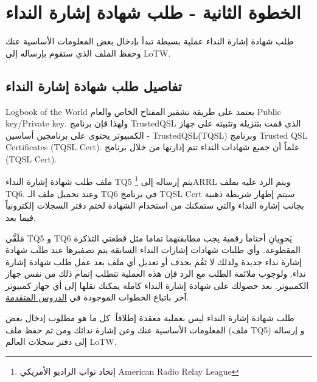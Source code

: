 \documentclass[a4paper,12pt]{article}
\begin{document}
\section{الخطوة الثانية - طلب شهادة إشارة النداء}\label{sec:2}

طلب شهادة إشارة النداء عملية بسيطة تبدأ بإدخال بعض المعلومات الأساسية
عنك وحفظ الملف الذي ستقوم بإرساله إلى \textenglish{LoTW}.

\vspace{18pt}
\begin{center}
	\color{slategray2}
{\Huge \decoone}
\end{center}

\subsection{تفاصيل طلب شهادة إشارة النداء}

\textenglish{Logbook of the World} يعتمد على طريقة تشفير المفتاح الخاص والعام \textenglish{Public
key/Private key}. ولهذا فإن برنامج \textenglish{TrustedQSL} الذي قمت بتنزيله وتثبيته
على جهاز الكمبيوتر يحتوى على برنامجين أساسين - \textenglish{TrustedQSL}(\textenglish{TQSL}) وبرنامج
\textenglish{Trusted QSL Certificates (TQSL Cert)}. علماً أن جميع شهادات النداء تتم
إدارتها من خلال برنامج \textenglish{(TQSL Cert)}.  

ملف طلب شهادة إشارة النداء \textenglish{TQ5} يتم إرساله إلى \textenglish{\footnote{إتحاد نواب الراديو الأمريكي \textenglish{American Radio Relay League}}ARRL} ويتم الرد عليه بملف \textenglish{TQ6}. وعند تحميل ملف الـ \textenglish{TQ6} في برنامج \textenglish{TQSL Cert} سيتم إظهار شريطة ذهبية بجانب إشارة النداء والتي ستمكنك من استخدام الشهادة لختم دفتر السجلات إلكترونياً فيما بعد.

مَلَفَّي \textenglish{TQ5} و \textenglish{TQ6} يَحوِيانِ أختاماَ رقمية يجب مطابقتهما تماما مثل قطعتي
التذكرة المقطوعة. وأي طلبات شهادات إشارات النداء السابقة يتم تصفيرها عند
طلب شهادة إشارة نداء جديدة ولذلك لا تَقُم بحذف أو تعديل أي ملف بعد عمل طلب
شهادة إشارة نداء. ولوجوب ملائمة الطلب مع الرد فإن هذه العملية تتطلب إتمام ذلك من نفس جهاز الكمبيوتر. بعد حصولك على شهادة إشارة النداء كاملة يمكنك نقلها إلى أي جهاز كمبيوتر آخر باتباع الخطوات الموجودة في 
\href{http://www.arrl.org/advanced-lotw}{الدروس المتقدمة}.

طلب شهادة إشارة النداء ليس بعملية معقدة إطلاقاً. كل ما هو مطلوب إدخال بعض
المعلومات الأساسية عنك وعن إشارة ندائك ومن ثم حفظ ملف (ملف \textenglish{TQ5}) و
إرساله إلى دفتر سجلات العالم \textenglish{LoTW}.
\\
\end{document}
